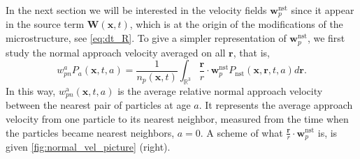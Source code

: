 In the next section we will be interested in the velocity fields $\textbf{w}_p^\text{nst}$ since it appear in the source term $\textbf{W}(\textbf{x},t)$, which is at the origin of the modifications of the microstructure, see \ref{eq:dt_R}. 
To give a simpler representation of $\textbf{w}_p^\text{nst}$, we first study the normal approach velocity averaged on all $\textbf{r}$, that is,  
\begin{equation*}
    w_{pn}^aP_a(\textbf{x},t,a)
    = \frac{1}{n_p(\textbf{x},t)}
    \int_{\mathbb{R}^3}
    \frac{\textbf{r}}{r} \cdot \textbf{w}^\text{nst}_p
    P_\text{nst}(\textbf{x},\textbf{r},t,a) d\textbf{r}.
\end{equation*}
In this way, $w^\text{a}_{pn}(\textbf{x},t,a)$ is the average relative normal approach velocity between the nearest pair of particles at age $a$. 
It represents the average approach velocity from one particle to its nearest neighbor, measured from the time when the particles became nearest neighbors, $a=0$.
A scheme of what $\frac{\textbf{r}}{r} \cdot \textbf{w}^\text{nst}_p$ is,  is given \ref{fig:normal_vel_picture} (right). 
